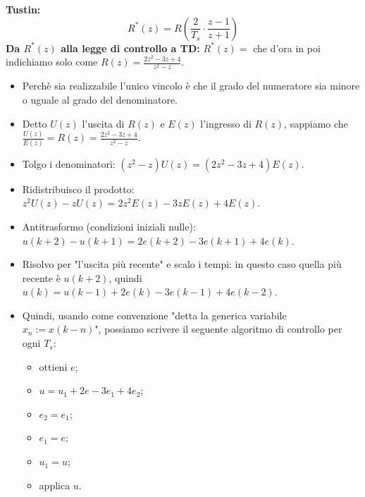 \begin{landscape}
\begin{multicols*}{3}
\textbf{Tustin:}
\[
    R^*(z) = R( \frac{2}{T_s} \cdot \frac{z-1}{z+1})
\]
\textbf{Da $R^*(z)$ alla legge di controllo a TD:}\newline
$R^*(z) = $ che d'ora in poi indichiamo solo come $R(z) = \frac{2z^2 - 3z +4}{z^2 -z}$. 
\begin{itemize}
    \item Perchè sia realizzabile l'unico vincolo è che il grado del numeratore sia minore o uguale al grado del denominatore.
    \item  Detto $U(z)$ l'uscita di $R(z)$ e $E(z)$ l'ingresso di $R(z)$, sappiamo che $\frac{U(z)}{E(z)} = R(z) = \frac{2z^2 - 3z +4}{z^2 -z}$.
    \item Tolgo i denominatori: $(z^2-z) U(z) = (2z^2 -3z+4) E(z)$.
    \item Ridistribuisco il prodotto: $z^2 U(z) - z U(z) = 2z^2 E(z) - 3zE(z) + 4 E(z)$.
    \item Antitrasformo (condizioni iniziali nulle): $u(k+2) - u(k+1) = 2e(k+2) -3e(k+1) + 4e(k)$.
    \item Risolvo per "l'uscita più recente" e scalo i tempi: in questo caso quella più recente è $u(k+2)$, quindi $u(k) = u(k-1) + 2 e(k) -3e(k-1) + 4e(k-2)$.
    \item Quindi, usando come convenzione "detta la generica variabile $x_n := x(k-n)$", possiamo scrivere il seguente algoritmo di controllo per ogni $T_s$:
    \begin{itemize}
        \item ottieni $e$;
        \item $u = u_1 +  2e - 3e_1 + 4e_2$;
        \item $e_2 = e_1$;
        \item $e_1 = e$;
        \item $u_1 = u$;
        \item applica $u$.
    \end{itemize}
\end{itemize}

\end{multicols*}
\end{landscape}